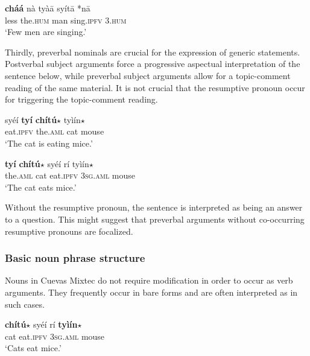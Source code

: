 \documentclass[output=paper,modfonts,nonflat]{langsci/langscibook}
\begin{document}
\ea {}\label{ex:cisneros:25}
\gll
{\ob}\textbf{ch\'a\'a} n\`a ty\`a\=a{\cb} sy\'it\=a {\op}\textnormal{*}n\=a{\cp}\\
{\db}less the.\textsc{hum} man sing.\textsc{ipfv} \phantom{(*}3.\textsc{hum}\\
\glt
`Few men are singing.'
\z 

Thirdly, preverbal nominals are crucial for the expression of generic statements.  Postverbal subject arguments force a progressive aspectual interpretation of the sentence below, while preverbal subject arguments allow for a topic-comment reading of the same material.  It is not crucial that the resumptive pronoun occur for triggering the topic-comment reading.

\ea {}\label{ex:cisneros:26}
\ea
\gll
sy\'e\'i {\ob}\textbf{ty\'i} \textbf{ch\'it\'u$\star$}{\cb} ty\`i\'in$\star$\\
eat.\textsc{ipfv} \phantom{[}the.\textsc{aml} cat mouse\\
\glt `The cat is eating mice.'

\ex
\gll
{\ob}\textbf{ty\'i} \textbf{ch\'it\'u$\star$}{\cb} sy\'e\'i {\op}r\'i{\cp} ty\`i\'in$\star$\\
{\db}the.\textsc{aml} cat eat.\textsc{ipfv} {\phantom{(}}3\textsc{sg.aml} mouse\\
\glt `The cat eats mice.'
\z 
\z

Without the resumptive pronoun, the sentence is interpreted as being an answer to a question.  This might suggest that preverbal arguments without co-occurring resumptive pronouns are focalized.

\subsubsection{Basic noun phrase structure} \label{sec:cisneros:3.3.2}

Nouns in Cuevas Mixtec do not require modification in order to occur as verb arguments.  They frequently occur in bare forms and are often interpreted as  in such cases.

\ea {}\label{ex:cisneros:27}
\gll \textbf{ch\'it\'u$\star$} sy\'e\'i r\'i \textbf{ty\`i\'in$\star$}\\
cat eat.\textsc{ipfv} 3\textsc{sg.aml} mouse\\
\glt `Cats eat mice.'
\z 
\end{document}
